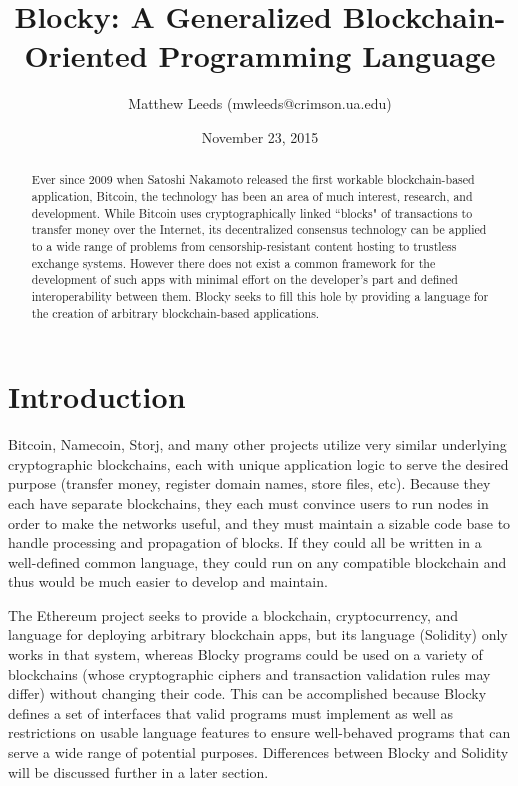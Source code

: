 \documentclass[letterpaper]{article}
\title{Blocky: A Generalized Blockchain-Oriented Programming Language}
\author{Matthew Leeds (mwleeds@crimson.ua.edu)}
\date{November 23, 2015}
\begin{document}
\maketitle

\begin{abstract}
Ever since 2009 when Satoshi Nakamoto released the first workable blockchain-based application, Bitcoin, the technology has been an area of much interest, research, and development. While Bitcoin uses cryptographically linked ``blocks" of transactions to transfer money over the Internet, its decentralized consensus technology can be applied to a wide range of problems from censorship-resistant content hosting to trustless exchange systems. However there does not exist a common framework for the development of such apps with minimal effort on the developer's part and defined interoperability between them. Blocky seeks to fill this hole by providing a language for the creation of arbitrary blockchain-based applications.
\end{abstract}

\section{Introduction}

Bitcoin, Namecoin, Storj, and many other projects utilize very similar underlying cryptographic blockchains, each with unique application logic to serve the desired purpose (transfer money, register domain names, store files, etc). Because they each have separate blockchains, they each must convince users to run nodes in order to make the networks useful, and they must maintain a sizable code base to handle processing and propagation of blocks. If they could all be written in a well-defined common language, they could run on any compatible blockchain and thus would be much easier to develop and maintain.

The Ethereum project seeks to provide a blockchain, cryptocurrency, and language for deploying arbitrary blockchain apps, but its language (Solidity) only works in that system, whereas Blocky programs could be used on a variety of blockchains (whose cryptographic ciphers and transaction validation rules may differ) without changing their code. This can be accomplished because Blocky defines a set of interfaces that valid programs must implement as well as restrictions on usable language features to ensure well-behaved programs that can serve a wide range of potential purposes. Differences between Blocky and Solidity will be discussed further in a later section.
\end{document}
